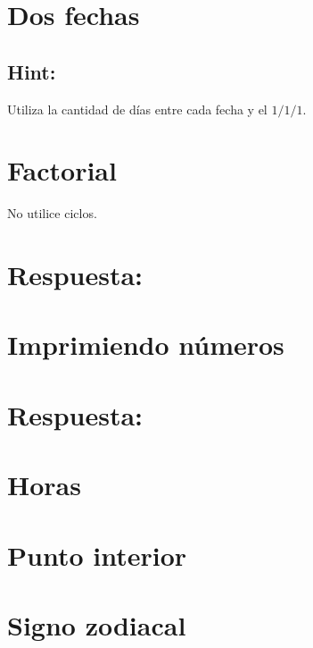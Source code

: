 \section{Dos fechas}


\ifshowanswers
\subsection*{Hint:} 
Utiliza la cantidad de días entre cada fecha y el $1/1/1$.
\fi

\section{Factorial}

No utilice ciclos.

\ifshowanswers
\section*{Respuesta:}

\fi

\section{Imprimiendo números}


\ifshowanswers
\section*{Respuesta:}

\fi

\section{Horas}


\section{Punto interior}


\section{Signo zodiacal}

